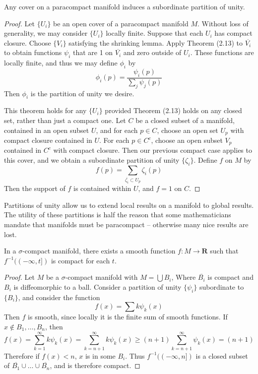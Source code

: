 \begin{theorem}
    Any cover on a paracompact manifold induces a subordinate partition of unity.
\end{theorem}
\begin{proof}
    Let $\{ U_i \}$ be an open cover of a paracompact manifold $M$. Without loss of generality, we may consider $\{ U_i \}$ locally finite. Suppose that each $U_i$ has compact closure. Choose $\{ V_i \}$ satisfying the shrinking lemma. Apply Theorem (2.13) to $\overline{V_i}$ to obtain functions $\psi_i$ that are 1 on $\overline{V_i}$ and zero outside of $U_i$. These functions are locally finite, and thus we may define $\phi_i$ by
    \[ \phi_i(p) = \frac{\psi_i(p)}{\sum_j \psi_j(p)} \]
    Then $\phi_i$ is the partition of unity we desire.

    This theorem holds for any $\{ U_i \}$ provided Theorem (2.13) holds on any closed set, rather than just a compact one. Let $C$ be a closed subset of a manifold, contained in an open subset $U$, and for each $p \in C$, choose an open set $U_p$ with compact closure contained in $U$. For each $p \in C^c$, choose an open subset $V_p$ contained in $C^c$ with compact closure. Then our previous compact case applies to this cover, and we obtain a subordinate partition of unity $\{ \zeta_i \}$. Define $f$ on $M$ by
    \[ f(p) = \sum_{\overline{\zeta_i} \subset U_p} \zeta_i(p) \]
    Then the support of $f$ is contained within $U$, and $f = 1$ on $C$.
\end{proof}

Partitions of unity allow us to extend local results on a manifold to global results. The utility of these partitions is half the reason that some mathematicians mandate that manifolds must be paracompact -- otherwise many nice results are lost.

\begin{theorem}
    In a $\sigma$-compact manifold, there exists a smooth function $f:M \to \mathbf{R}$ such that $f^{-1}((-\infty, t])$ is compact for each $t$.
\end{theorem}
\begin{proof}
    Let $M$ be a $\sigma$-compact manifold with $M = \bigcup B_i$, Where $\overline{B_i}$ is compact and $B_i$ is diffeomorphic to a ball. Consider a partition of unity $\{\psi_i\}$ subordinate to $\{B_i\}$, and consider the function
    \[ f(x) = \sum k \psi_k(x) \]
    Then $f$ is smooth, since locally it is the finite sum of smooth functions. If $x \not \in B_1, \dots, B_n$, then
    \[ f(x) = \sum_{k = 1}^\infty k \psi_k(x) = \sum_{k = n+1}^\infty k \psi_k(x) \geq (n+1) \sum_{k = n+1}^\infty \psi_k(x) = (n+1) \]
    Therefore if $f(x) < n$, $x$ is in some $B_i$. Thus $f^{-1}((-\infty, n])$ is a closed subset of $\overline{B_1} \cup \dots \cup \overline{B_n}$, and is therefore compact.
\end{proof}





